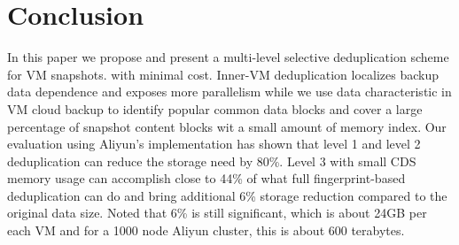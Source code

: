 \section{Conclusion}
\label{sect:final}
In this paper we propose and present a multi-level selective deduplication scheme for VM snapshots. 
with minimal cost. Inner-VM deduplication localizes backup data dependence and exposes more parallelism  
while we use  data characteristic in VM cloud backup to identify popular common data blocks
and cover  a large percentage of snapshot content blocks wit a small amount of memory index.
Our evaluation using Aliyun's implementation has shown that 
level 1 and level 2 deduplication can reduce the storage need by 80\%. 
Level 3 with small CDS memory usage can accomplish close to 44\% of what full fingerprint-based
deduplication can do and bring additional 6\% storage reduction compared to the original data size.
Noted that 6\% is still significant, which is about 24GB per each VM and for a 1000 node Aliyun cluster,
this is about 600 terabytes.
 
%
%


